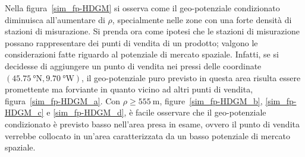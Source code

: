 Nella figura~\ref{sim_fp-HDGM} si osserva come il geo-potenziale condizionato diminuisca all'aumentare di $\rho$, specialmente nelle zone con una forte densità di stazioni di misurazione. Si prenda ora come ipotesi che le stazioni di misurazione possano rappresentare dei punti di vendita di un prodotto; valgono le considerazioni fatte riguardo al potenziale di mercato spaziale. Infatti, se si decidesse di aggiungere un punto di vendita nei pressi delle coordinate $(\SI{45.75}{\degree} \text{N}, \SI{9.70}{\degree} \text{W})$, il geo-potenziale puro previsto in questa area risulta essere promettente ma forviante in quanto vicino ad altri punti di vendita, figura~\ref{sim_fp-HDGM_a}. Con $\rho \geq \SI{555}{\meter}$, figure~\ref{sim_fp-HDGM_b}, \ref{sim_fp-HDGM_c} e \ref{sim_fp-HDGM_d}, è facile osservare che il geo-potenziale condizionato è previsto basso nell'area presa in esame, ovvero il punto di vendita verrebbe collocato in un'area caratterizzata da un basso potenziale di mercato spaziale.